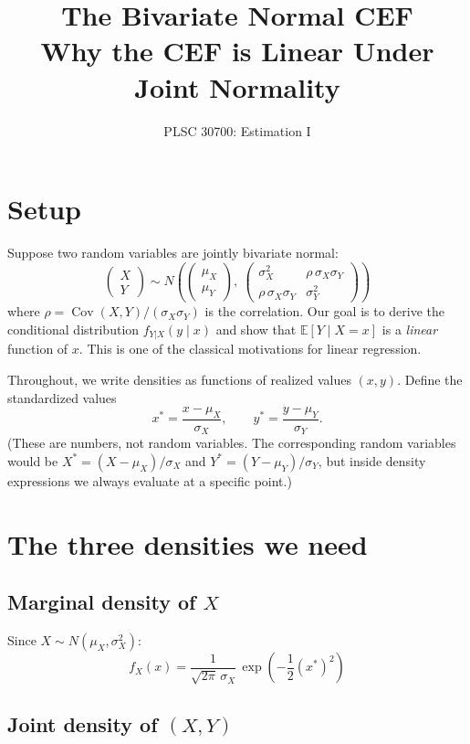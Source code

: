 \documentclass[11pt]{article}
\title{The Bivariate Normal CEF\\[4pt]\large Why the CEF is Linear Under Joint Normality}
\author{PLSC 30700: Estimation I}
\date{}
\newcommand{\Cov}{\operatorname{Cov}}
\begin{document}
\maketitle

\section{Setup}

Suppose two random variables are jointly bivariate normal:
\[
\begin{pmatrix} X \\ Y \end{pmatrix}
\sim N\!\left(
\begin{pmatrix} \mu_X \\ \mu_Y \end{pmatrix},\
\begin{pmatrix} \sigma_X^2 & \rho\,\sigma_X\sigma_Y \\ \rho\,\sigma_X\sigma_Y & \sigma_Y^2 \end{pmatrix}
\right)
\]
where $\rho = \Cov(X,Y)/(\sigma_X\sigma_Y)$ is the correlation.  Our goal is to derive the conditional distribution $f_{Y|X}(y\mid x)$ and show that $\mathbb{E}[Y\mid X=x]$ is a \emph{linear} function of $x$.  This is one of the classical motivations for linear regression.

\medskip
Throughout, we write densities as functions of realized values $(x,y)$.  Define the standardized values
\[
x^* = \frac{x - \mu_X}{\sigma_X}, \qquad y^* = \frac{y - \mu_Y}{\sigma_Y}.
\]
(These are numbers, not random variables.  The corresponding random variables would be $X^*=(X-\mu_X)/\sigma_X$ and $Y^*=(Y-\mu_Y)/\sigma_Y$, but inside density expressions we always evaluate at a specific point.)

\section{The three densities we need}

\subsection{Marginal density of $X$}

Since $X\sim N(\mu_X, \sigma_X^2)$:
\begin{equation}\label{eq:marginal}
f_X(x) = \frac{1}{\sqrt{2\pi}\,\sigma_X}\,\exp\!\left(-\frac{1}{2}(x^*)^2\right)
\end{equation}

\subsection{Joint density of $(X,Y)$}
\end{document}
